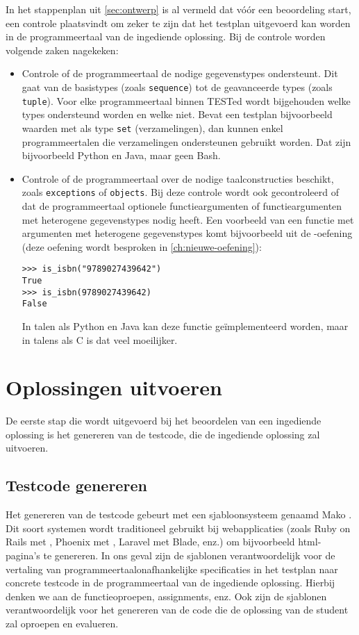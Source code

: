 In het stappenplan uit \cref{sec:ontwerp} is al vermeld dat vóór een beoordeling start, een controle plaatsvindt om zeker te zijn dat het testplan uitgevoerd kan worden in de programmeertaal van de ingediende oplossing.
Bij de controle worden volgende zaken nagekeken:
\begin{itemize}
    \item Controle of de programmeertaal de nodige gegevenstypes ondersteunt.
    Dit gaat van de basistypes (zoals \texttt{sequence}) tot de geavanceerde types (zoals \texttt{tuple}).
    Voor elke programmeertaal binnen TESTed wordt bijgehouden welke types ondersteund worden en welke niet.
    Bevat een testplan bijvoorbeeld waarden met als type \texttt{set} (verzamelingen), dan kunnen enkel programmeertalen die verzamelingen ondersteunen gebruikt worden.
    Dat zijn bijvoorbeeld Python en Java, maar geen Bash.
    \item Controle of de programmeertaal over de nodige taalconstructies beschikt, zoals \texttt{exceptions} of \texttt{objects}.
    Bij deze controle wordt ook gecontroleerd of dat de programmeertaal optionele functieargumenten of functieargumenten met heterogene gegevenstypes nodig heeft.
    Een voorbeeld van een functie met argumenten met heterogene gegevenstypes komt bijvoorbeeld uit de -oefening (deze oefening wordt besproken in \cref{ch:nieuwe-oefening}):
    \begin{verbatim}
>>> is_isbn("9789027439642")
True
>>> is_isbn(9789027439642)
False
    \end{verbatim}
    In talen als Python en Java kan deze functie geïmplementeerd worden, maar in talens als C is dat veel moeilijker.
\end{itemize}

\section{Oplossingen uitvoeren}\label{sec:oplossingen-uitvoeren}

De eerste stap die wordt uitgevoerd bij het beoordelen van een ingediende oplossing is het genereren van de testcode, die de ingediende oplossing zal uitvoeren.

\subsection{Testcode genereren}\label{subsec:testcode-genereren}

Het genereren van de testcode gebeurt met een sjabloonsysteem genaamd Mako \autocite{mako}.
Dit soort systemen wordt traditioneel gebruikt bij webapplicaties (zoals Ruby on Rails met , Phoenix met , Laravel met Blade, enz.) om bijvoorbeeld html-pagina's te genereren.
In ons geval zijn de sjablonen verantwoordelijk voor de vertaling van programmeertaalonafhankelijke specificaties in het testplan naar concrete testcode in de programmeertaal van de ingediende oplossing.
Hierbij denken we aan de functieoproepen, assignments, enz.
Ook zijn de sjablonen verantwoordelijk voor het genereren van de code die de oplossing van de student zal oproepen en evalueren.


